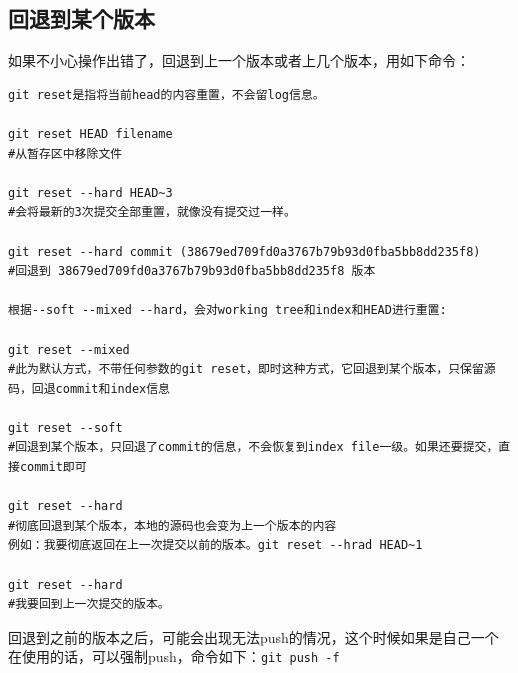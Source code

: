 \documentclass[a4paper,12pt]{ctexart}
\begin{document}
\subsection{回退到某个版本}
如果不小心操作出错了，回退到上一个版本或者上几个版本，用如下命令：
\begin{verbatim}
git reset是指将当前head的内容重置，不会留log信息。

git reset HEAD filename
#从暂存区中移除文件

git reset --hard HEAD~3
#会将最新的3次提交全部重置，就像没有提交过一样。

git reset --hard commit (38679ed709fd0a3767b79b93d0fba5bb8dd235f8)
#回退到 38679ed709fd0a3767b79b93d0fba5bb8dd235f8 版本

根据--soft --mixed --hard，会对working tree和index和HEAD进行重置:

git reset --mixed
#此为默认方式，不带任何参数的git reset，即时这种方式，它回退到某个版本，只保留源码，回退commit和index信息

git reset --soft
#回退到某个版本，只回退了commit的信息，不会恢复到index file一级。如果还要提交，直接commit即可

git reset --hard
#彻底回退到某个版本，本地的源码也会变为上一个版本的内容
例如：我要彻底返回在上一次提交以前的版本。git reset --hrad HEAD~1

git reset --hard
#我要回到上一次提交的版本。
\end{verbatim}
回退到之前的版本之后，可能会出现无法push的情况，这个时候如果是自己一个在使用的话，可以强制push，命令如下：\verb|git push -f|

\newpage
\end{document}
